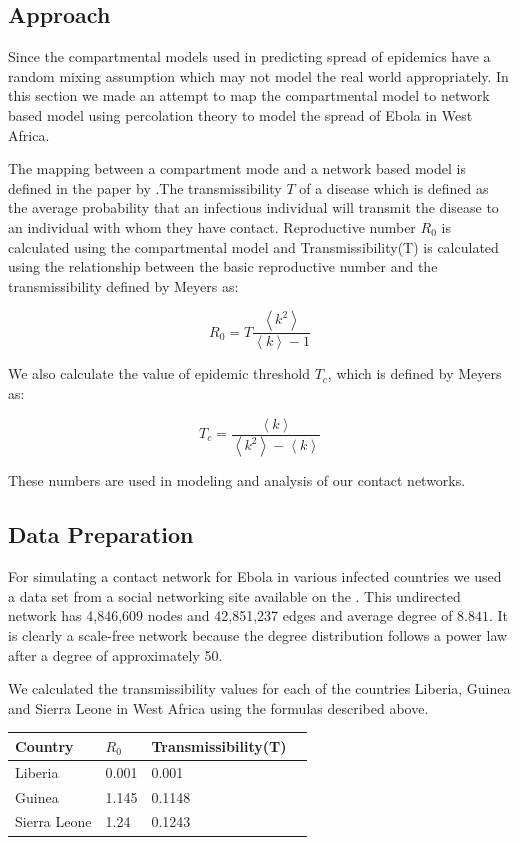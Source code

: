 \documentclass[10pt, journal,onecolumn]{IEEEtran}
\begin{document}
\subsection*{\textbf{Approach}}
Since the compartmental models used in predicting spread of epidemics have a random mixing assumption which may not model the real world appropriately. In this section we made an attempt  to map the compartmental model to network based model  using percolation theory to model the spread of Ebola in West Africa.



The mapping between a compartment mode and a network based model is defined in the paper by \cite{meyers2005network}.The transmissibility $T$ of a disease which is defined as the average probability that an infectious
individual will transmit the disease to an individual with whom they have contact. 
Reproductive number $R_0$  is calculated using the compartmental model and 
Transmissibility(T) is calculated using the relationship between the basic reproductive number
 and the transmissibility defined by Meyers as:

\[
R_0 = T  \dfrac{\left\langle k^2 \right\rangle}{\left\langle k \right\rangle-1}
\]


We also calculate the value of epidemic threshold $T_c$, which is defined by Meyers as:

\[
T_c =\dfrac{\left\langle k \right\rangle}{\left\langle k^2 \right\rangle - \left\langle k \right\rangle}
\]

These numbers are used in modeling and analysis of our contact networks.


\subsection*{\textbf{Data Preparation}}

For simulating a contact network for Ebola in various infected countries we used a data set from a social networking site available on
the \cite{topcoderdata}.
This undirected network has 4,846,609 nodes and 42,851,237 edges and average degree of $8.841$.
It is clearly a scale-free network because the degree distribution follows a power law after a degree of
approximately 50.

We calculated the transmissibility values for each of the countries Liberia, Guinea and Sierra Leone in West Africa  using the formulas described above. 

\begin{center}
    \begin{tabular}{ | l | l | l | p{5cm} |}
    \hline
    Country & $R_0$ & Transmissibility(T) \\ \hline
    \hline
    Liberia & 0.001 & 0.001  \\ \hline
    Guinea & 1.145 & 0.1148 \\ \hline
    Sierra Leone & 1.24 & 0.1243  \\ \hline
    \end{tabular}
\end{center}
\end{document}
